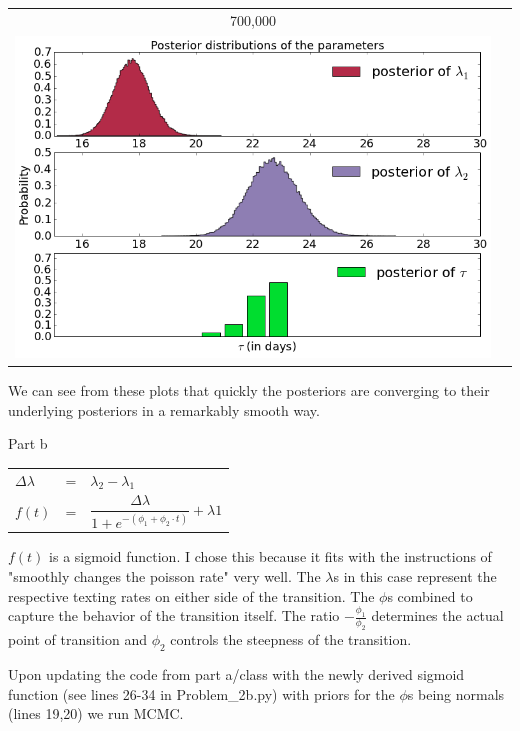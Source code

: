 \documentclass[]{article}
\begin{document}
\begin{enumerate}
\begin{adjustbox}{center}
\begin{tabular}{cc}
700,000 & \\
 \includegraphics[scale = 0.22]{n_700000.png}  & \\
\end{tabular}
\end{adjustbox}

We can see from these plots that quickly the posteriors are converging to their underlying posteriors in a remarkably smooth way. 

\newpage
{\large Part b}  
\vspace{2em}

\begin{adjustbox}{center}
\begin{tabular}{lcl}
$ \Delta\lambda$ & = & $ \lambda_2 - \lambda_1$ \\
$f(t)$ & = &   $ \dfrac{ \Delta\lambda}{1+e^{-(\phi_1 + \phi_2 \cdot t)}} + \lambda 1$ \\
\end{tabular}
\end{adjustbox}

\vspace{2em}
$f(t)$ is a sigmoid function. I chose this because it fits with the instructions of "smoothly changes the poisson rate" very well. 
The $\lambda$s in this case represent the respective texting rates on either side of the transition. 
The $\phi$s combined to capture the behavior of the transition itself. The ratio $-\frac{\phi_1}{\phi_2}$ determines the actual point of transition and $\phi_2$ controls the steepness of the transition. 

\vspace{1em}
Upon updating the code from part a/class with the newly derived sigmoid function (see lines 26-34 in Problem\_2b.py) with priors for the $\phi$s being normals (lines 19,20) we run MCMC. 


\end{enumerate}
\end{document}
